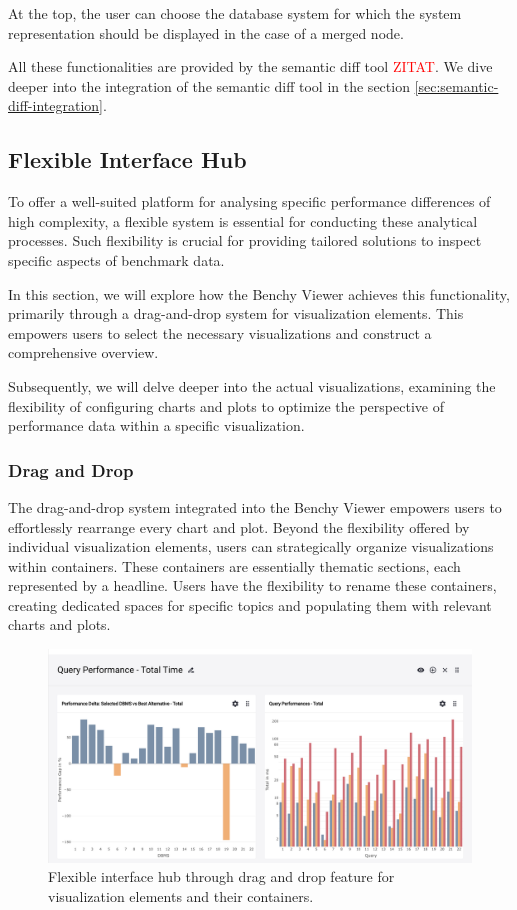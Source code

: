 At the top, the user can choose the database system for which the system representation should be displayed in the case of a merged node.

All these functionalities are provided by the semantic diff tool \textcolor{red}{ZITAT}. We dive deeper into the integration of the semantic diff tool in the section \ref{sec:semantic-diff-integration}.


\subsection{Flexible Interface Hub}

To offer a well-suited platform for analysing specific performance differences of high complexity, a flexible system is essential for conducting these analytical processes. Such flexibility is crucial for providing tailored solutions to inspect specific aspects of benchmark data.

In this section, we will explore how the Benchy Viewer achieves this functionality, primarily through a drag-and-drop system for visualization elements. This empowers users to select the necessary visualizations and construct a comprehensive overview.

Subsequently, we will delve deeper into the actual visualizations, examining the flexibility of configuring charts and plots to optimize the perspective of performance data within a specific visualization.

\subsubsection{Drag and Drop}
The drag-and-drop system integrated into the Benchy Viewer empowers users to effortlessly rearrange every chart and plot. Beyond the flexibility offered by individual visualization elements, users can strategically organize visualizations within containers. These containers are essentially thematic sections, each represented by a headline. Users have the flexibility to rename these containers, creating dedicated spaces for specific topics and populating them with relevant charts and plots.

\begin{figure}[h]
  \centering
  \includegraphics[width=0.8\linewidth]{figures/analytics-drag-and-drop.png}
  \caption{Flexible interface hub through drag and drop feature for visualization elements and their containers.}
  \label{fig:analytics-drag-and-drop}
\end{figure}

